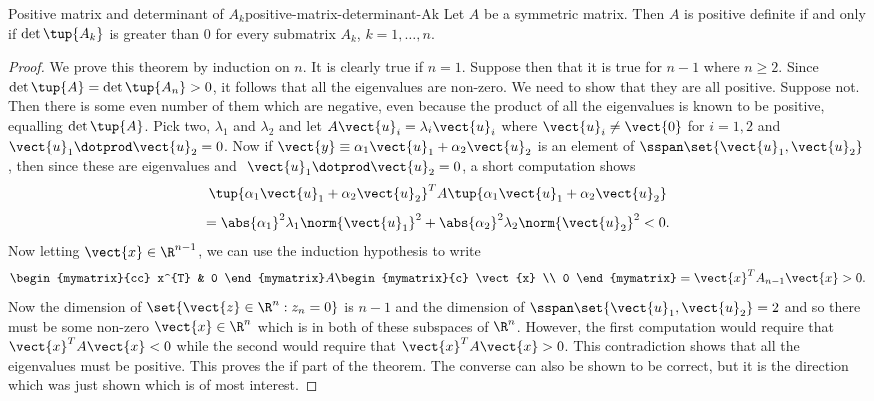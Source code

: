 \begin{theorem}{Positive matrix and determinant of $A_k$}{positive-matrix-determinant-Ak}   
Let $A$ be a symmetric matrix. Then $A$ is positive definite if
and only if $\det \tup{A_{k}}$ is greater than $0$ for every submatrix $A_{k}$,  $k=1,\ldots,n$. 
\end{theorem}

\begin{proof}
We prove this theorem by induction on $n$. It is clearly
true if $n=1$. Suppose then that it is true for $n-1$ where $n\geq 2$. Since 
$\det \tup{A} =\det \tup{A_{n}} >0$, it follows that all the
eigenvalues are non-zero. We need to show that they are all positive. Suppose
not. Then there is some even number of them which are negative, even because
the product of all the eigenvalues is known to be positive, equalling $\det
\tup{A}$. Pick two, $\lambda _{1}$ and $\lambda _{2}$ and let $A
\vect{u}_{i}=\lambda _{i}\vect{u}_{i}$ where $\vect{u}_{i}\neq \vect{0}$ for $
i=1,2$ and $\vect{u}_{1}\dotprod \vect{u}_{2}=0$. Now if $\vect{y}\equiv \alpha
_{1}\vect{u}_{1}+\alpha _{2}\vect{u}_{2}$ is an element of $\sspan\set{
\vect{u}_{1},\vect{u}_{2}}$, then since these are eigenvalues and $\ 
\vect{u}_{1}\dotprod \vect{u}_{2}=0$, a short computation shows 
\begin{equation*}
\tup{\alpha _{1}\vect{u}_{1}+\alpha _{2}\vect{u}_{2}} ^{T}A\tup{
\alpha _{1}\vect{u}_{1}+\alpha _{2}\vect{u}_{2}}
\end{equation*}
\begin{equation*}
=\abs{\alpha _{1}}^{2}\lambda _{1}\norm{\vect{u}
_{1}} ^{2}+\abs{\alpha _{2}}^{2}\lambda
_{2}\norm{\vect{u}_{2}} ^{2}<0.
\end{equation*}
Now letting $\vect{x}\in \R^{n-1}$, we can use the induction
hypothesis to write 
\begin{equation*}
\begin{mymatrix}{cc}
x^{T} & 0
\end{mymatrix} A\begin{mymatrix}{c}
\vect{x} \\ 
0
\end{mymatrix} =\vect{x}^{T}A_{n-1}\vect{x}>0.
\end{equation*}
Now the dimension of $\set{\vect{z}\in \R^{n}:z_{n}=0} $ is 
$n-1$ and the dimension of $\sspan\set{\vect{u}_{1},\vect{u}
_{2}} =2$ and so there must be some non-zero $\vect{x}\in \R
^{n} $ which is in both of these subspaces of $\R^{n}$. However, the
first computation would require that $\vect{x}^{T}A\vect{x}<0$ while the
second would require that $\vect{x}^{T}A\vect{x}>0$. This contradiction shows
that all the eigenvalues must be positive. This proves the if part of the
theorem. The converse can also be shown to be correct, but it is the
direction which was just shown which is of most interest. 
\end{proof}

